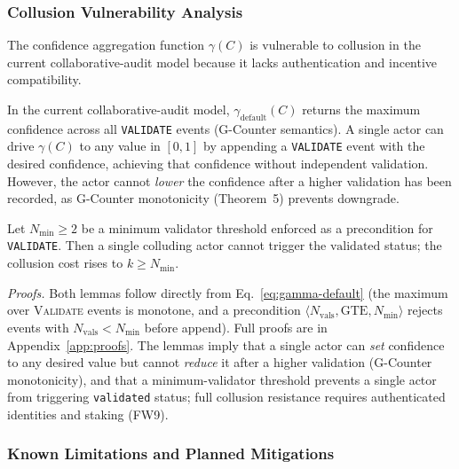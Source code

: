 \subsubsection{Collusion Vulnerability Analysis}\label{subsubsec:collusion-analysis}

The confidence aggregation function $\gamma(C)$ is vulnerable to collusion in the current collaborative-audit model because it lacks authentication and incentive compatibility.

\begin{lemma}\label{lem:collusion-vulnerability}
In the current collaborative-audit model, $\gamma_{\text{default}}(C)$ returns the maximum confidence across all \texttt{VALIDATE} events (G-Counter semantics). A single actor can drive $\gamma(C)$ to any value in $[0,1]$ by appending a \texttt{VALIDATE} event with the desired confidence, achieving that confidence without independent validation. However, the actor cannot \emph{lower} the confidence after a higher validation has been recorded, as G-Counter monotonicity (Theorem~5) prevents downgrade.
\end{lemma}

\begin{lemma}\label{lem:threshold-mitigation}
Let $N_{\min} \geq 2$ be a minimum validator threshold enforced as a precondition for \texttt{VALIDATE}. Then a single colluding actor cannot trigger the $\text{validated}$ status; the collusion cost rises to $k \geq N_{\min}$.
\end{lemma}

\emph{Proofs.} Both lemmas follow directly from Eq.~\ref{eq:gamma-default} (the maximum over \textsc{Validate} events is monotone, and a precondition $\langle N_{\text{vals}}, \text{GTE}, N_{\min} \rangle$ rejects events with $N_{\text{vals}} < N_{\min}$ before append). Full proofs are in Appendix~\ref{app:proofs}. The lemmas imply that a single actor can \emph{set} confidence to any desired value but cannot \emph{reduce} it after a higher validation (G-Counter monotonicity), and that a minimum-validator threshold prevents a single actor from triggering \texttt{validated} status; full collusion resistance requires authenticated identities and staking (FW9).

\subsubsection{Known Limitations and Planned Mitigations}

